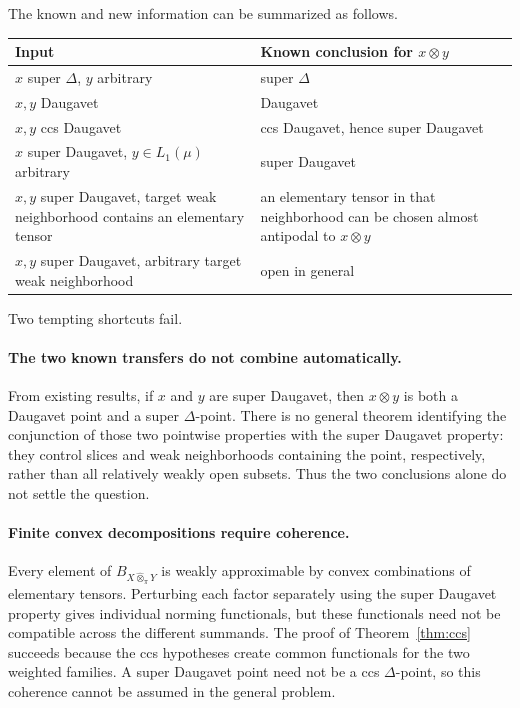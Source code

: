 \documentclass[11pt]{article}
\theoremstyle{definition}
\newcommand{\whotpi}{\widehat{\otimes}_{\pi}}
\begin{document}
The known and new information can be summarized as follows.

\begin{center}
\begin{tabular}{p{}p{}}
\toprule
Input & Known conclusion for $x\otimes y$ \\
\midrule
$x$ super $\Delta$, $y$ arbitrary & super $\Delta$ \\
$x,y$ Daugavet & Daugavet \\
$x,y$ ccs Daugavet & ccs Daugavet, hence super Daugavet \\
$x$ super Daugavet, $y\in L_1(\mu)$ arbitrary & super Daugavet \\
$x,y$ super Daugavet, target weak neighborhood contains an elementary tensor
& an elementary tensor in that neighborhood can be chosen almost antipodal to
$x\otimes y$ \\
$x,y$ super Daugavet, arbitrary target weak neighborhood & open in general \\
\bottomrule
\end{tabular}
\end{center}

Two tempting shortcuts fail.

\paragraph{The two known transfers do not combine automatically.}
From existing results, if $x$ and $y$ are super Daugavet, then $x\otimes y$ is
both a Daugavet point and a super $\Delta$-point.  There is no general theorem
identifying the conjunction of those two pointwise properties with the super
Daugavet property: they control slices and weak neighborhoods containing the
point, respectively, rather than all relatively weakly open subsets.  Thus the
two conclusions alone do not settle the question.

\paragraph{Finite convex decompositions require coherence.}
Every element of $B_{X\whotpi Y}$ is weakly approximable by convex
combinations of elementary tensors.  Perturbing each factor separately using
the super Daugavet property gives individual norming functionals, but these
functionals need not be compatible across the different summands.  The proof
of Theorem~\ref{thm:ccs} succeeds because the ccs hypotheses create common
functionals for the two weighted families.  A super Daugavet point need not be
a ccs $\Delta$-point, so this coherence cannot be assumed in the general
problem.
\end{document}
